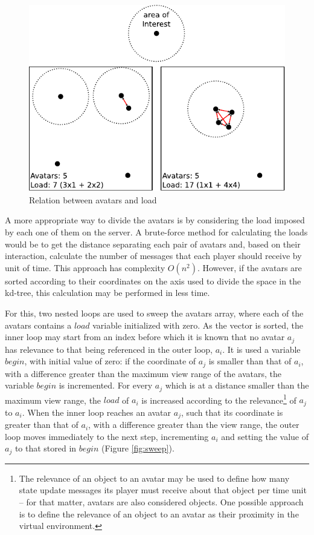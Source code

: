 \documentclass[acmjacm]{acmtrans2m}
\newcommand{\figurecaption}{Figure}
\begin{document}
\begin{figure}
  \centering
  \includegraphics[width=0.8\linewidth]{images/carga}
  \caption{Relation between avatars and load}
  \label{fig:load}
\end{figure}

A more appropriate way to divide the avatars is by considering the load imposed by each one of them on the server. A brute-force method for calculating the loads would be to get the distance separating each pair of avatars and, based on their interaction, calculate the number of messages that each player should receive by unit of time. This approach has complexity $O(n^2)$. However, if the avatars are sorted according to their coordinates on the axis used to divide the space in the kd-tree, this calculation may be performed in less time.

For this, two nested loops are used to sweep the avatars array, where each of the avatars contains a $load$ variable initialized with zero. As the vector is sorted, the inner loop may start from an index before which it is known that no avatar $a_j$ has relevance to that being referenced in the outer loop, $a_i$. It is used a variable $begin$, with initial value of zero: if the coordinate of $a_j$ is smaller than that of $a_i$, with a difference greater than the maximum view range of the avatars, the variable $begin$ is incremented. For every $a_j$ which is at a distance smaller than the maximum view range, the $load$ of $a_i$ is increased according to the relevance\footnote{The relevance of an object to an avatar may be used to define how many state update messages its player must receive about that object per time unit \cite{bezerra2008a3} -- for that matter, avatars are also considered objects. One possible approach is to define the relevance of an object to an avatar as their proximity in the virtual environment.} of $a_j$ to $a_i$. When the inner loop reaches an avatar $a_j$, such that its coordinate is greater than that of $a_i$, with a difference greater than the view range, the outer loop moves immediately to the next step, incrementing $a_i$ and setting the value of $a_j$ to that stored in $begin$ (\figurecaption{} \ref{fig:sweep}).
\end{document}

